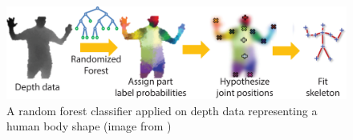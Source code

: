 \begin{figure}[t]
\centering
    \includegraphics[width=1.0\columnwidth]{fig/img/kinect}
    \caption{
    A random forest classifier applied on depth data representing a human body shape (image from \protect\cite{Fossati:2013:CDC}) }
    \label{fig:kinect}
\end{figure}

